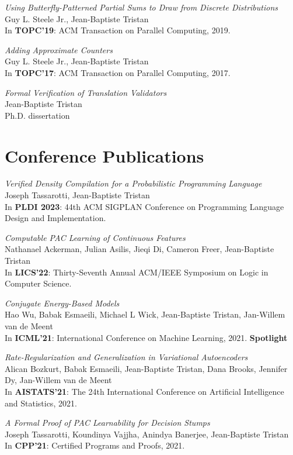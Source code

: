 \documentclass[margin,line]{res}
\begin{document}
\begin{resume}
\emph{Using Butterfly-Patterned Partial Sums to Draw from Discrete Distributions}\\
Guy L. Steele Jr., Jean-Baptiste Tristan\\
In {\bf TOPC'19}: ACM Transaction on Parallel Computing, 2019.

\emph{Adding Approximate Counters}\\
Guy L. Steele Jr., Jean-Baptiste Tristan\\
In {\bf TOPC'17}: ACM Transaction on Parallel Computing, 2017.

\emph{Formal Verification of Translation Validators}\\
Jean-Baptiste Tristan\\
Ph.D. dissertation

\section{\sc Conference Publications}

\emph{Verified Density Compilation for a Probabilistic Programming Language}\\
Joseph Tassarotti, Jean-Baptiste Tristan\\
In {\bf PLDI 2023}: 44th ACM SIGPLAN Conference on Programming Language Design and Implementation.

\emph{Computable PAC Learning of Continuous Features}\\
Nathanael Ackerman, Julian Asilis, Jieqi Di, Cameron Freer, Jean-Baptiste Tristan\\
In {\bf LICS'22}: Thirty-Seventh Annual ACM/IEEE Symposium on
Logic in Computer Science.

\emph{Conjugate Energy-Based Models}\\
Hao Wu, Babak Esmaeili, Michael L Wick, Jean-Baptiste Tristan, Jan-Willem van de Meent\\
In {\bf ICML'21}: International Conference on Machine Learning, 2021. {\bf Spotlight}

\emph{Rate-Regularization and Generalization in Variational Autoencoders}\\
Alican Bozkurt, Babak Esmaeili, Jean-Baptiste Tristan, Dana Brooks, Jennifer Dy, Jan-Willem van de Meent\\
In {\bf AISTATS'21}: The 24th International Conference on
Artificial Intelligence and Statistics, 2021.

\emph{A Formal Proof of PAC Learnability for Decision Stumps}\\
Joseph Tassarotti, Koundinya Vajjha, Anindya Banerjee, Jean-Baptiste Tristan\\
In {\bf CPP'21}: Certified Programs and Proofs, 2021.


\end{resume}
\end{document}
